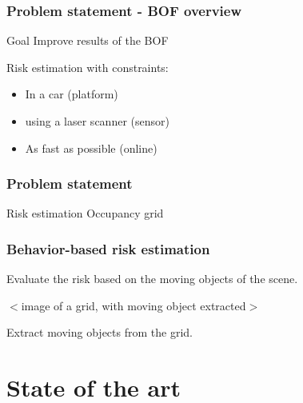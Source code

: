 \documentclass{beamer}
\begin{document}
\begin{frame}
		
				
				
	\end{frame}
	
	\begin{frame}
		\frametitle{Problem statement - BOF overview}
		\begin{block}{Goal}
			 Improve results of the BOF
		\end{block}
		Risk estimation with constraints:
		\begin{itemize}
			\item In a car (platform)
			\item using a laser scanner (sensor)
			\item As fast as possible (online)
		\end{itemize}
	\end{frame}

	\begin{frame}
		\frametitle{Problem statement}
		Risk estimation
		Occupancy grid	
	\end{frame}
	
	\begin{frame}
		\frametitle{Behavior-based risk estimation}

		Evaluate the risk based on the moving objects of the scene.

		$<$image of a grid, with moving object extracted$>$

		Extract moving objects from the grid.

	\end{frame}
\section{State of the art}
\end{document}
